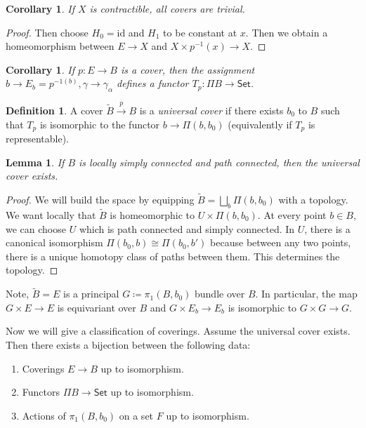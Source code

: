 \documentclass[leqno, openany]{memoir}
\newtheorem{cor}[thm]{Corollary}
\newtheorem{lem}[thm]{Lemma}
\theoremstyle{definition}
\newtheorem{defn}[thm]{Definition}
\theoremstyle{remark}
\theoremstyle{plain}
\theoremstyle{definition}
\theoremstyle{remark}
\newcommand{\mr}[1]{\mathrm{#1}}
\newcommand{\ms}[1]{\mathsf{#1}}
\newcommand{\wt}[1]{\widetilde{#1}}
\begin{document}
\begin{cor}
    If $X$ is contractible, all covers are trivial.  
\end{cor}

\begin{proof}
    Then choose $H_0 = \mr{id}$ and $H_1$ to be constant at $x$. Then we obtain a homeomorphism between $E \to X$ and $X \times p^{-1}(x) \to X$.
\end{proof}

\begin{cor}
    If $p: E \to B$ is a cover, then the assignment $b \to E_b = p^{-1(b)}, \gamma \to \gamma_{\alpha}$ defines a functor $T_p: \Pi B \to \ms{Set}$.
\end{cor}

\begin{defn}
    A cover $\wt{B} \xrightarrow{p} B$ is a \textit{universal cover} if there exists $b_0$ to $B$ such that $T_p$ is isomorphic to the functor $b \to \Pi(b,b_0)$ (equivalently if $T_p$ is representable).
\end{defn}

\begin{lem}
    If $B$ is locally simply connected and path connected, then the universal cover exists.
\end{lem}

\begin{proof}
    We will build the space by equipping $\wt{B} = \bigsqcup_b \Pi(b,b_0)$ with a topology. We want locally that $\wt{B}$ is homeomorphic to $U \times \Pi(b,b_0)$. At every point $b \in B$, we can choose $U$ which is path connected and simply connected. In $U$, there is a canonical isomorphism $\Pi(b_0,b) \cong \Pi(b_0,b')$ because between any two points, there is a unique homotopy class of paths between them. This determines the topology.
\end{proof}

Note, $\wt{B} = E$ is a principal $G \coloneqq \pi_1(B,b_0)$ bundle over $B$. In particular, the map $G \times E \to E$ is equivariant over $B$ and $G \times E_b \to E_b$ is isomorphic to $G \times G \to G$.

Now we will give a classification of coverings. Assume the universal cover exists. Then there exists a bijection between the following data:
\begin{enumerate}
    \item Coverings $E \to B$ up to isomorphism.
    \item Functors $\Pi B \to \ms{Set}$ up to isomorphism.
    \item Actions of $\pi_1(B,b_0)$ on a set $F$ up to isomorphism.
\end{enumerate}
\end{document}

